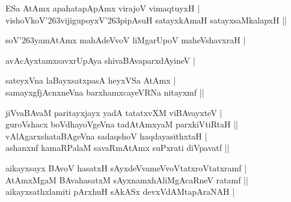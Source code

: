 \begin{entry}
\smallskip
\begin{shl}
ESa AtAmx apahatapApAmx virajoV vimaqtuyxH |\\
vishoVkoV{\char'263}vijigupoyxV{\char'263}pipAsuH satayxkAmaH satayxsaMkalapxH ||
\end{shl}
\medskip
{}
\smallskip
\begin{shl}
soV{\char'263}yamAtAmx mahAdeVvoV liMgarUpoV maheVshavxraH |
\end{shl}
\medskip
{}
\smallskip
\begin{shl}
avAcAyxtamxsavxrUpAya shivaBAvaparxdAyineV |
\end{shl}
\medskip
{}
\smallskip
\begin{shl}
sateyxVna laBayxsatxpasA heyxVSa AtAmx |\\
samayxgfjAcnxneVna barxhamxcayeVRNa nitayxmf ||
\end{shl}
\smallskip
\begin{shl}
jiVvaBAvaM paritayxjayx yadA tatatxvXM viBAvayxteV |\\
guroVshacx boVdhayoVgeVna tadAtAmxyaM parxkiVtiRtaH ||\\
vAlAgarxshataBAgeVna sadaqshoV haqdayasithxtaH |\\
ashanxnf kamaRPalaM savaRmAtAmx suPxrati diVpavatf ||
\end{shl}
\medskip
{}
\smallskip
\begin{shl}
aikayxsayx BAvoV hasatxH sAyxdeVvameVvoVtatxroVtatxramf |\\
AtAmxMgaM BAvahasatxM sAyxnamxhAliMgAcaRneV ratamf ||\\
aikayxsathxlamiti pArxhuH sAkASx devxVdAMtapAraNAH |\\
\end{shl}
\medskip
{}

\end{entry}
